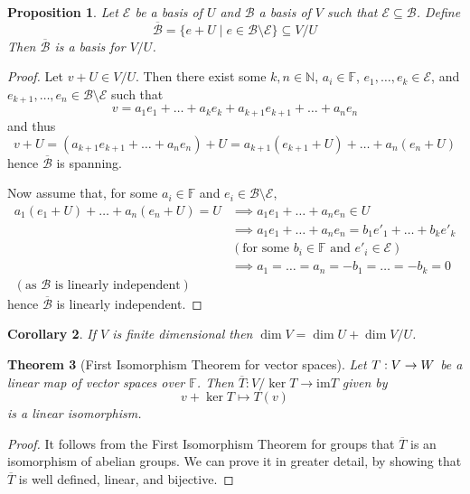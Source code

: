 \documentclass[10pt,fleqn]{article}
\newcommand{\im}{\mathrm{im}}
\newcommand{\field}{\mathbb{F}}
\newcommand{\basis}{\mathcal{B}}
\newcommand{\varbasis}{\mathcal{E}}
\theoremstyle{definition} \newtheorem{defn}{Definition}[section]
\theoremstyle{plain}      \newtheorem{thm}[defn]{Theorem}
\theoremstyle{plain}      \newtheorem{prop}[defn]{Proposition}
\theoremstyle{plain}      \newtheorem{lem}[defn]{Lemma}
\theoremstyle{plain}      \newtheorem{cor}[defn]{Corollary}
\theoremstyle{plain}      \newtheorem{ad}[defn]{Addendum}
\theoremstyle{definition} \newtheorem{ex}[defn]{Example}
\theoremstyle{definition} \newtheorem{rem}[defn]{Remark}
\numberwithin{equation}{subsection}
\begin{document}
\begin{prop}\label{quotient-basis}
    Let $\varbasis$ be a basis of $U$ and $\basis$ a basis of $V$ such that $\varbasis\subseteq\basis$.
    Define
    \[
        \overline{\basis}=
        \{e+U\mid e\in\basis\setminus\varbasis\}\subseteq
        V/U
    \]
    Then $\overline{\basis}$ is a basis for $V/U$.
\end{prop}

\begin{proof}
    Let $v+U\in V/U$.
    Then there exist some $k,n\in\mathbb{N}$, $a_i\in\field$, $e_1,\ldots,e_k\in\varbasis$, and $e_{k+1},\ldots,e_n\in\basis\setminus\varbasis$ such that
    \[
        v=
        a_1e_1+\ldots+a_ke_k+a_{k+1}e_{k+1}+\ldots+a_ne_n
    \]
    and thus
    \[
        v+U=
        (a_{k+1}e_{k+1}+\ldots+a_ne_n)+U=
        a_{k+1}(e_{k+1}+U)+\ldots+a_n(e_n+U)
    \]
    hence $\overline{\basis}$ is spanning.

    Now assume that, for some $a_i\in\field$ and $e_i\in\basis\setminus\varbasis$,
    \begin{align*}
        a_1(e_1+U)+\ldots+a_n(e_n+U)=U
        &\implies
        a_1e_1+\ldots+a_ne_n\in U\\
        &\implies
        a_1e_1+\ldots+a_ne_n=b_1e'_1+\ldots+b_ke'_k\\
        &(\text{for some }b_i\in\field\text{ and }e'_i\in\varbasis)\\
        &\implies
        a_1=\ldots=a_n=-b_1=\ldots=-b_k=0\\
        (\text{as }\basis\text{ is linearly independent})
    \end{align*}
    hence $\overline{\basis}$ is linearly independent.
\end{proof}

\begin{cor}
    If $V$ is finite dimensional then $\dim V=\dim U+\dim V/U$.
\end{cor}

\begin{thm}[First Isomorphism Theorem for vector spaces]
    Let $T:V\to\nobreak W$ be a linear map of vector spaces over $\field$.
    Then $\overline{T}:V/\ker T\to\im T$ given by
    \[
        v+\ker T\mapsto T(v)
    \]
    is a linear isomorphism.
\end{thm}

\begin{proof}
    It follows from the First Isomorphism Theorem for groups that $\overline{T}$ is an isomorphism of abelian groups.
    We can prove it in greater detail, by showing that $\overline{T}$ is well defined, linear, and bijective.
\end{proof}
\end{document}
